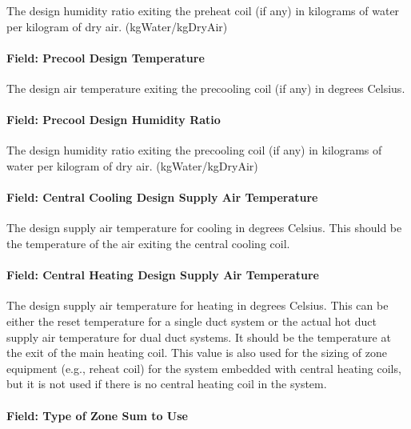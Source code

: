 The design humidity ratio exiting the preheat coil (if any) in kilograms of water per kilogram of dry air. (kgWater/kgDryAir)

\paragraph{Field: Precool Design Temperature}\label{field-precool-design-temperature}

The design air temperature exiting the precooling coil (if any) in degrees Celsius.

\paragraph{Field: Precool Design Humidity Ratio}\label{field-precool-design-humidity-ratio}

The design humidity ratio exiting the precooling coil (if any) in kilograms of water per kilogram of dry air. (kgWater/kgDryAir)

\paragraph{Field: Central Cooling Design Supply Air Temperature}\label{field-central-cooling-design-supply-air-temperature}

The design supply air temperature for cooling in degrees Celsius. This should be the temperature of the air exiting the central cooling coil.

\paragraph{Field: Central Heating Design Supply Air Temperature}\label{field-central-heating-design-supply-air-temperature}

The design supply air temperature for heating in degrees Celsius. This can be either the reset temperature for a single duct system or the actual hot duct supply air temperature for dual duct systems. It should be the temperature at the exit of the main heating coil. This value is also used for the sizing of zone equipment (e.g., reheat coil) for the system embedded with central heating coils, but it is not used if there is no central heating coil in the system.

\paragraph{Field: Type of Zone Sum to Use}\label{field-type-of-zone-sum-to-use}


